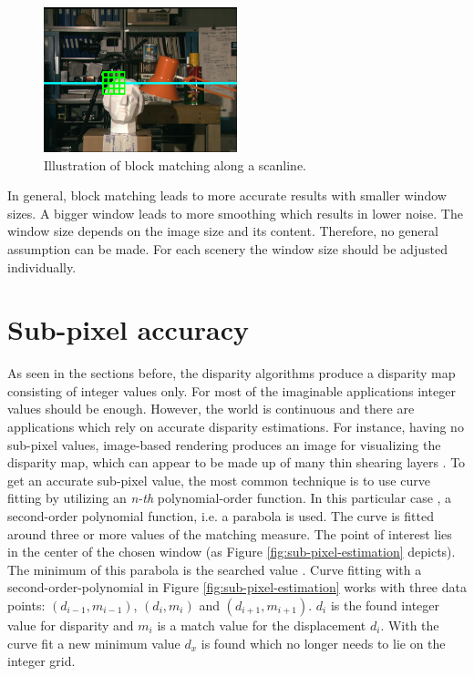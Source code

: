 \begin{figure}[h!]
  \centering
  \includegraphics[width=0.5\textwidth]{src/images/tsukuba-block.png}
  \caption{Illustration of block matching along a scanline.}
  \label{fig:tsukuba-block}
\end{figure}

\noindent In general, block matching leads to more accurate results with smaller window sizes.
A bigger window leads to more smoothing which results in lower noise.
The window size depends on the image size and its content.
Therefore, no general assumption can be made.
For each scenery the window size should be adjusted individually.

\section{Sub-pixel accuracy}

As seen in the sections before, the disparity algorithms produce a disparity map consisting of integer values only.
For most of the imaginable applications integer values should be enough.
However, the world is continuous and there are applications which rely on accurate disparity estimations.
For instance, having no sub-pixel values, image-based rendering produces an image for visualizing the disparity map, which can appear to be made up of many thin shearing layers \citep{scharstein2002taxonomy}.
To get an accurate sub-pixel value, the most common technique is to use curve fitting by utilizing an \textit{n-th} polynomial-order function.
In this particular case \citep{scharstein2002taxonomy}, a second-order polynomial function, i.e. a parabola is used.
The curve is fitted around three or more values of the matching measure.
The point of interest lies in the center of the chosen window (as Figure \ref{fig:sub-pixel-estimation} depicts).
The minimum of this parabola is the searched value \citep{cyganek2011introduction, scharstein2014high}.
\newline\newline\noindent Curve fitting with a second-order-polynomial in Figure \ref{fig:sub-pixel-estimation} works with three data points: $(d_{i-1}, m_{i-1})$, $(d_{i}, m_{i})$ and $(d_{i+1}, m_{i+1})$.
$d_i$ is the found integer value for disparity and $m_i$ is a match value for the displacement $d_i$.
With the curve fit a new minimum value $d_x$ is found which no longer needs to lie on the integer grid.


